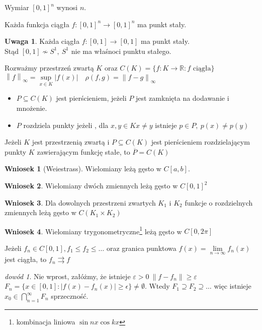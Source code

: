 \documentclass[twoside,10pt]{article}
\newcommand{\norm}[1]{\left\lVert#1\right\rVert}
\theoremstyle{definition}
\theoremstyle{definition}
\theoremstyle{definition}
\theoremstyle{definition}
\theoremstyle{remark}
\newtheorem*{dd}{dowód}
\theoremstyle{definition}
\newtheorem*{uw}{Uwaga}
\theoremstyle{definition}
\newtheorem*{wn}{Wniosek}
\theoremstyle{definition}
\theoremstyle{definition}
\theoremstyle{definition}
\theoremstyle{definition}
\begin{document}
\begin{tw} Wymiar $[0,1]^n$ wynosi $n$. \end{tw} 
\begin{tw}[Brouwera] 
    Każda funkcja ciągła $f: [0,1]^n \to [0,1]^n$ ma punkt stały. 
\end{tw} 
\begin{uw} 
    Każda ciągła $f: [0,1] \to [0,1]$ ma punkt stały. \\ 
    Stąd $[0,1] \nsim S^1,\ S^1$ nie ma właśnoci punktu stałego.
\end{uw} 
Rozważmy przestrzeń zwartą $K$ oraz $C(K) = \{f: K \to \mathbb R: f \text{ ciągła}\}$ \\ 
$\norm{f}_\infty = \sup\limits_{x \in K} |f(x)| \quad \rho(f,g) = \norm{f-g}_\infty$
\begin{df} \hfill 
    \begin{itemize} 
        \item $P \subseteq C(K)$ jest pierścieniem, jeżeli $P$ jest zamknięta na dodawanie
            i mnożenie.
        \item $P$ rozdziela punkty jeżeli , dla $x,y \in K 
            x \neq y$ istnieje $p \in P,\ p(x) \neq p(y)$
    \end{itemize} 
\end{df} 
\begin{tw}
    Jeżeli $K$ jest przestrzenią zwartą i $P \subseteq C(K)$ jest pierścieniem 
    rozdzielającym punkty $K$ zawierającym funkcję stałe, to $\overline P = C(K)$
\end{tw} 
\begin{wn}[Weiestrass] Wielomiany leżą gęsto w $C[a,b]$. \end{wn} 
\begin{wn} Wielomiany dwóch zmiennych leżą gęsto w $C[0,1]^2$ \end{wn} 
\begin{wn} Dla dowolnych przestrzeni zwartych $K_1$ i $K_2$ funkcje o rozdzielnych
zmiennych leżą gęsto w $C(K_1 \times K_2)$ \end{wn}
\begin{wn} Wielomiany trygonometryczne\footnote{kombinacja liniowa $\sin nx \cos kx$}
    leżą gęsto w $C[0,2\pi]$ \end{wn} 
\begin{lem}[Diniego]
    Jeżeli $f_n \in C[0,1], f_1 \le f_2 \le \ldots$ oraz granica punktowa 
    $f(x) = \lim\limits_{n \to \infty} f_n(x) $ jest ciągła, to $f_n \rightrightarrows f$
    \begin{dd} 
        Nie wprost, załóżmy, że istnieje $\varepsilon > 0 \ \norm{f-f_n} \ge \varepsilon$
        $F_n = \{x \in [0,1]: |f(x)-f_n(x)| \ge \epsilon \} \neq \emptyset$. 
        Wtedy $F_1 \supseteq F_2 \supseteq \ldots$ więc istnieje $x_0 \in \bigcap\limits
        _{n=1}^\infty F_n$ sprzeczność.
    \end{dd} 
\end{lem} 
\end{document}
